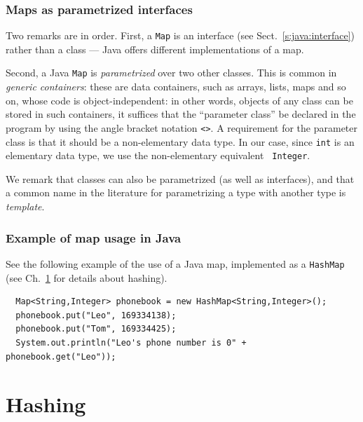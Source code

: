 \documentclass[a4paper]{book}
\theoremstyle{changebreak}                %
\begin{document}
\subsection{Maps as parametrized interfaces}
\label{s:linear:map:parametrized}
Two remarks are in order. First, a {\tt Map} is an
interface (see Sect.~\ref{s:java:interface}) rather than a class ---
Java offers different implementations of a map. 

Second, a Java {\tt Map} is {\it
  parametrized} over two other classes. This
is common in {\it generic containers}: these
are data containers, such as arrays, lists, maps and so on, whose code
is object-independent: in other words, objects of any class can be
stored in such containers, it suffices that the ``parameter
class'' be declared in the program by using the
angle bracket notation {\tt <>}. A requirement for the
parameter class is that it should be a non-elementary data
type. In our case, since {\tt int} is
an elementary data type, we use the non-elementary equivalent {\tt
  Integer}.

We remark that classes can also be parametrized (as well as
interfaces), and that a common name in the literature for
parametrizing a type with another type is
{\it template}.

\subsection{Example of map usage in Java}
See the following example of the use of a Java map, implemented as a
{\tt HashMap} (see Ch.~\ref{c:hash} for details about hashing).
\begin{verbatim}
  Map<String,Integer> phonebook = new HashMap<String,Integer>();
  phonebook.put("Leo", 169334138);
  phonebook.put("Tom", 169334425);
  System.out.println("Leo's phone number is 0" + phonebook.get("Leo"));
\end{verbatim}

\chapter{Hashing}
\label{c:hash}

\begin{center}
\end{center}
\end{document}
